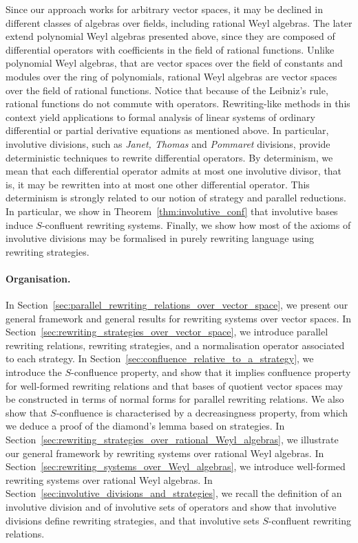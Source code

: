 \documentclass[11pt]{article}
\theoremstyle{definition}
\begin{document}
Since our approach works for arbitrary vector spaces, it may be declined
in different classes of algebras over fields, including rational Weyl
algebras. The later extend polynomial Weyl algebras presented above,
since they are composed of differential operators with coefficients in
the field of rational functions. Unlike polynomial Weyl algebras, that
are vector spaces over the field of constants and modules over the ring
of polynomials, rational Weyl algebras are vector spaces over the field
of rational functions. Notice that because of the Leibniz's rule,
rational functions do not commute with operators. Rewriting-like methods
in this context yield applications to formal analysis of linear systems
of ordinary differential or partial derivative equations as mentioned
above. In particular, involutive divisions, such as {\em Janet, Thomas}
and {\em Pommaret} divisions, provide deterministic techniques to rewrite
differential operators. By determinism, we mean that each differential
operator admits at most one involutive divisor, that is, it may be
rewritten into at most one other differential operator. This determinism
is strongly related to our notion of strategy and parallel reductions. In
particular, we show in  Theorem~\ref{thm:involutive_conf} that involutive
bases induce $S$-confluent rewriting systems. Finally, we show how most
of the axioms of involutive divisions may be formalised in purely
rewriting language using rewriting strategies.
\medskip

\paragraph{Organisation.}

In Section~\ref{sec:parallel_rewriting_relations_over_vector_space}, we
present our general framework and general results for rewriting systems
over vector spaces. In
Section~\ref{sec:rewriting_strategies_over_vector_space}, we introduce
parallel rewriting relations, rewriting strategies, and a normalisation
operator associated to each strategy. In
Section~\ref{sec:confluence_relative_to_a_strategy}, we introduce the
$S$-confluence property, and show that it implies confluence property for
well-formed rewriting relations and that bases of quotient vector spaces
may be constructed in terms of normal forms for parallel rewriting
relations. We also show that $S$-confluence is characterised by a
decreasingness property, from which we deduce a proof of the diamond's
lemma based on strategies. In
Section~\ref{sec:rewriting_strategies_over_rational_Weyl_algebras}, we
illustrate our general framework by rewriting systems over rational 
Weyl algebras. In Section~\ref{sec:rewriting_systems_over_Weyl_algebras},
we introduce well-formed rewriting systems over rational Weyl algebras. 
In Section~\ref{sec:involutive_divisions_and_strategies}, we recall the
definition of an involutive division and of involutive sets of operators
and show that involutive divisions define rewriting strategies, and that
involutive sets $S$-confluent rewriting relations.
\medskip
\end{document}
